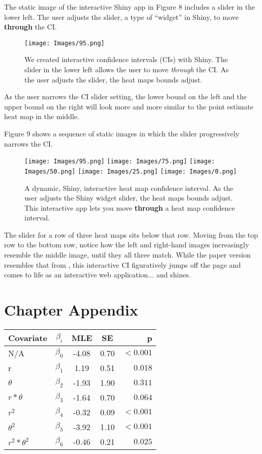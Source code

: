 The static image of the interactive Shiny app in Figure 8 includes a slider in the lower left. The user adjusts the slider, a type of ``widget'' in Shiny, to move {\bf through} the CI.

  \begin{figure}[H]
	\centering
	\texttt{[image: Images/95.png]}
	\caption{We created interactive confidence intervals (CIs) with Shiny. The slider in the lower left allows the user to move {\it through} the CI. As the user adjusts the slider, the heat maps bounds adjust.}
	\end{figure}

As the user narrows the CI slider setting, the lower bound on the left and the upper bound on the right will look more and more similar to the point estimate heat map in the middle.

Figure 9 shows a sequence of static images in which the slider progressively narrows the CI.
  \begin{figure}[H]
	\centering
	\texttt{[image: Images/95.png]}
	\texttt{[image: Images/75.png]}
	\texttt{[image: Images/50.png]}
	\texttt{[image: Images/25.png]}
	\texttt{[image: Images/0.png]}
	\caption{A dynamic, Shiny, interactive heat map confidence interval. As the user adjusts the Shiny widget slider, the heat maps bounds adjust. This interactive app lets you move {\bf through} a heat map confidence interval.}
	\end{figure}

The slider for a row of three heat maps sits below that row. Moving from the top row to the bottom row, notice how the left and right-hand images increasingly resemble the middle image, until they all three match. While the paper version resembles that from \cite{Cross2015}, this interactive CI figuratively jumps off the page and comes to life as an interactive web application... and shines.

\section{Chapter Appendix}

\begin{tabular}[b]{ l | c | c | c | r }
    \hline
    Covariate         & $\beta_{i}$ & MLE   & SE     &      p  \\ \hline \hline
    N/A               & $\beta_{0}$ & -4.08 & 0.70 & $ <0.001$ \\ \hline
    r                 & $\beta_{1}$ &  1.19 & 0.51 & $  0.018$ \\ \hline
    $\theta$          & $\beta_{2}$ & -1.93 & 1.90 & $  0.311$ \\ \hline
    $r*\theta$        & $\beta_{3}$ & -1.64 & 0.70 & $  0.064$ \\ \hline
    $r^{2}$           & $\beta_{4}$ & -0.32 & 0.09 & $ <0.001$ \\ \hline
    $\theta^{2}$      & $\beta_{5}$ & -3.92 & 1.10 & $ <0.001$ \\ \hline
    $r^{2}*\theta^{2}$& $\beta_{6}$ & -0.46 & 0.21 & $  0.025$ \\ \hline
    \hline
\end{tabular}
